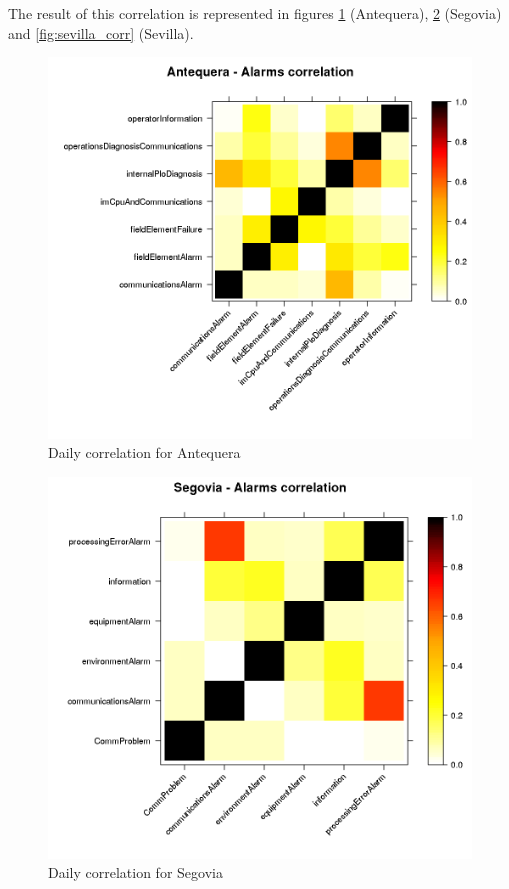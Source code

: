 The result of this correlation is represented in figures \ref{fig:anteq_corr} (Antequera), \ref{fig:segovia_corr} (Segovia) and \ref{fig:sevilla_corr} (Sevilla).

\begin{figure}[htb]
 \centering
 \includegraphics[width=\textwidth]{./img/antequera_corr.png}
 \caption{Daily correlation for Antequera} \label{fig:anteq_corr}
\end{figure}
\begin{figure}[htb]
 \centering
 \includegraphics[width=\textwidth]{./img/segovia_corr.png}
 \caption{Daily correlation for Segovia} \label{fig:segovia_corr}
\end{figure}
